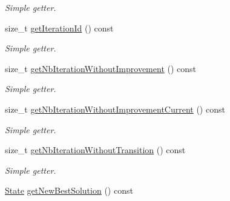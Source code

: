 \begin{DoxyCompactItemize}
\begin{DoxyCompactList}\small\item\em Simple getter. \end{DoxyCompactList}\item 
\hypertarget{classALNS__Iteration__Status_a88178a99b0c70ed6bba29f3ca3422263}{size\-\_\-t \hyperlink{classALNS__Iteration__Status_a88178a99b0c70ed6bba29f3ca3422263}{get\-Iteration\-Id} () const }\label{classALNS__Iteration__Status_a88178a99b0c70ed6bba29f3ca3422263}

\begin{DoxyCompactList}\small\item\em Simple getter. \end{DoxyCompactList}\item 
\hypertarget{classALNS__Iteration__Status_aaa6f6deb1a2eef0c5fbaf501633c0fa4}{size\-\_\-t \hyperlink{classALNS__Iteration__Status_aaa6f6deb1a2eef0c5fbaf501633c0fa4}{get\-Nb\-Iteration\-Without\-Improvement} () const }\label{classALNS__Iteration__Status_aaa6f6deb1a2eef0c5fbaf501633c0fa4}

\begin{DoxyCompactList}\small\item\em Simple getter. \end{DoxyCompactList}\item 
\hypertarget{classALNS__Iteration__Status_ad67a5c238a0dcc071eb596fed5db91d1}{size\-\_\-t \hyperlink{classALNS__Iteration__Status_ad67a5c238a0dcc071eb596fed5db91d1}{get\-Nb\-Iteration\-Without\-Improvement\-Current} () const }\label{classALNS__Iteration__Status_ad67a5c238a0dcc071eb596fed5db91d1}

\begin{DoxyCompactList}\small\item\em Simple getter. \end{DoxyCompactList}\item 
\hypertarget{classALNS__Iteration__Status_a676ecc31ff5d41df003cb5883e120e4b}{size\-\_\-t \hyperlink{classALNS__Iteration__Status_a676ecc31ff5d41df003cb5883e120e4b}{get\-Nb\-Iteration\-Without\-Transition} () const }\label{classALNS__Iteration__Status_a676ecc31ff5d41df003cb5883e120e4b}

\begin{DoxyCompactList}\small\item\em Simple getter. \end{DoxyCompactList}\item 
\hypertarget{classALNS__Iteration__Status_a36a461656092c00b578b380b19a31d2a}{\hyperlink{classALNS__Iteration__Status_a6d748b05080edeab9e82ac32c9904133}{State} \hyperlink{classALNS__Iteration__Status_a36a461656092c00b578b380b19a31d2a}{get\-New\-Best\-Solution} () const }\label{classALNS__Iteration__Status_a36a461656092c00b578b380b19a31d2a}


\end{DoxyCompactItemize}
